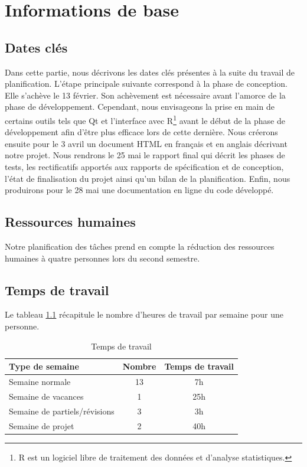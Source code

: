 \documentclass[a4paper]{report}
\begin{document}
\chapter{Informations de base}
\section{Dates clés}
Dans cette partie, nous décrivons les dates clés présentes à la suite du travail de planification. L'étape principale suivante correspond à la phase de conception. Elle s'achève le 13 février. Son achèvement est nécessaire avant l'amorce de la phase de développement. Cependant, nous envisageons la prise en main de certains outils tels que Qt et l'interface avec R\footnote{R est un logiciel libre de traitement des données et d'analyse statistiques.} avant le début de la phase de développement afin d'être plus efficace lors de cette dernière.
Nous créerons ensuite pour le 3 avril un document HTML en français et en anglais décrivant notre projet.
Nous rendrons le 25 mai le rapport final qui décrit les phases de tests, les rectificatifs apportés aux rapports de spécification et de conception, l'état de finalisation du projet ainsi qu'un bilan de la planification. Enfin, nous produirons pour le 28 mai une documentation en ligne du code développé.

\section{Ressources humaines}
Notre planification des tâches prend en compte la réduction des ressources humaines à quatre personnes lors du second semestre.

\section{Temps de travail}
Le tableau \ref{fig:travail} récapitule le nombre d'heures de travail par semaine pour une personne.

\begin{table}[H]
\centering
  \begin{tabularx}{0.8\textwidth}{| X | c | c |}
    \hline
	Type de semaine & Nombre & Temps de travail \\
    \hline
    Semaine normale & 13 & 7h \\
    \hline
    Semaine de vacances & 1 & 25h \\
    \hline
    Semaine de partiels/révisions & 3 & 3h \\
    \hline
    Semaine de projet & 2 & 40h \\
    \hline
  \end{tabularx}
  \caption{Temps de travail}
  \label{fig:travail}
\end{table}
\end{document}
